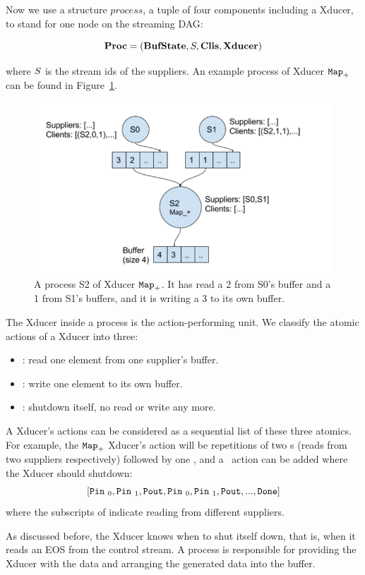 Now we use a structure $process$, a tuple of four components including a Xducer, to stand for one node on the streaming DAG:

$$ \proc  =  (\bufst, \S, \clis, \xducer) $$

where $\S$ is the stream ids of the suppliers. An example process of Xducer $\map{+}$ can be found in Figure~\ref{fig:process}.

\begin{figure}[H]
	\centering
	\includegraphics[width=0.9\linewidth]{fig/process}
	\caption{A process S2 of Xducer $\map{+}$. 
		It has read a 2 from S0's buffer and a 1 from S1's buffers, and it is writing a 3 to its own buffer.}
	\label{fig:process}
\end{figure}

The Xducer inside a process is the action-performing unit. 
We classify the atomic actions of a Xducer into three:
\begin{itemize}
	\item \pin: read one element from one supplier's buffer.
	\item \pout : write one element to its own buffer.
	\item \done: shutdown itself, no read or write any more.
\end{itemize}

A Xducer's actions can be considered as a sequential list of these three atomics.
For example,  the $\map{+}$ Xducer's action will be repetitions of two \pin s (reads from two suppliers respectively) followed by one \pout, and 
a \done \ action can be added where the Xducer should shutdown:
$$[\pin_0, \pin_1, \pout, \pin_0, \pin_1, \pout,... ,\done]$$
 where the subscripts of \pin indicate reading from different suppliers.

As discussed before, the Xducer knows when to shut itself down, that is, when it reads an EOS from the control stream. 
A process is responsible for providing the Xducer with the data and arranging the generated data into the buffer. 

